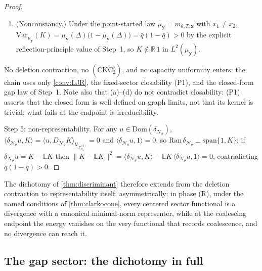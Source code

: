 \documentclass[reqno,final,11pt]{amsart}
\theoremstyle{plain}
\theoremstyle{definition}
\theoremstyle{remark}
\newcommand{\R}{\mathbb R}
\newcommand{\E}{\mathbb E}
\newcommand{\Dom}{\mathrm{Dom}}
\newcommand{\cE}{\mathcal E}
\newcommand{\cN}{\mathcal N}
\newcommand{\cU}{\mathcal U}
\newcommand{\GamN}{\Gamma^{(2)}_{\cN_\theta}}
\newcommand{\DN}{D_{\cN_\theta}}
\newcommand{\divN}{\delta_{\cN_\theta}}
\begin{document}
\begin{proof}
\begin{enumerate}
with $\cE_{\mathbf y}(K)=\|\DN K\|^2=0$.
\item[\textnormal{(e)}] (Nonconstancy.) Under the point-started law
$\mu_{\mathbf y}=m_{\theta,T,\mathbf x}$ with $x_1\neq x_2$,
$\mathrm{Var}_{\mu_{\mathbf y}}(K)
=\mu_{\mathbf y}(\Delta)\bigl(1-\mu_{\mathbf y}(\Delta)\bigr)
=\bar q(1-\bar q)>0$ by the explicit reflection-principle value of Step~1, so
$K\notin\R\,1$ in $L^2(\mu_{\mathbf y})$.
\end{enumerate}
No deletion contraction, no $(\mathrm{CKC}_2^{\flat})$, and no capacity
uniformity enters: the chain uses only \cref{conv:LJR}, the
fixed-sector closability \textnormal{(P1)}, and the closed-form gap law of
Step~1. Note also that
\textnormal{(a)}--\textnormal{(d)} do not contradict closability: \textnormal{(P1)}
asserts that the closed form is well defined on graph limits, not that its
kernel is trivial; what fails at the endpoint is irreducibility.

Step 5: non-representability. For any
$u\in\Dom(\divN)$,
$\langle\divN u,K\rangle=\langle u,\DN K\rangle_{\cU_{\GamN}}=0$ and
$\langle\divN u,1\rangle=0$, so
$\mathrm{Ran}\,\divN\perp\mathrm{span}\{1,K\}$; if $\divN u=K-\E K$ then
$\|K-\E K\|^2=\langle\divN u,K\rangle-\E K\,\langle\divN u,1\rangle=0$,
contradicting $\bar q(1-\bar q)>0$.
\end{proof}

The dichotomy of \cref{thm:discriminant} therefore extends from the deletion
contraction to representability itself, asymmetrically: in phase (R), under
the named conditions of \cref{thm:clarkocone}, every centered sector
functional is a divergence with a canonical minimal-norm representer, while at
the coalescing endpoint the energy vanishes on the very
functional that records coalescence, and no divergence can reach it.

\subsection{The gap sector: the dichotomy in full}\label{subsec:gapco}
\end{document}
